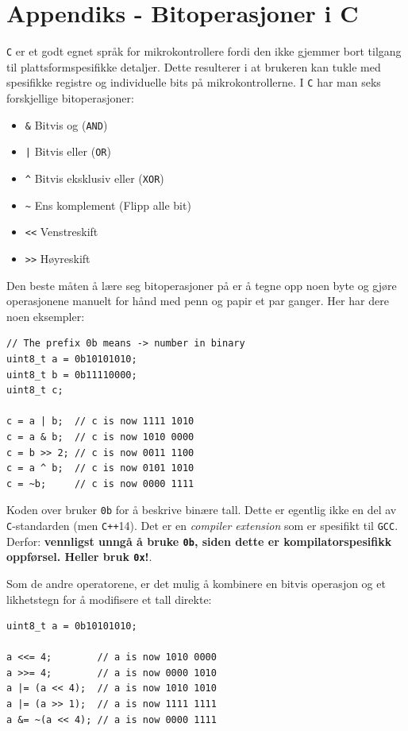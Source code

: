 \section{Appendiks - Bitoperasjoner i C}\label{app:bit}


\verb|C| er et godt egnet språk for mikrokontrollere fordi den ikke gjemmer bort tilgang til plattsformspesifikke detaljer. Dette resulterer i at brukeren kan tukle med spesifikke registre og individuelle bits på mikrokontrollerne. I \verb|C| har man seks forskjellige bitoperasjoner: 

\begin{itemize}
    \item \verb|&| Bitvis og (\verb|AND|)
    \item \texttt{|} Bitvis eller (\verb|OR|)
    \item \verb|^| Bitvis eksklusiv eller (\verb|XOR|)
    \item \verb|~| Ens komplement (Flipp alle bit)
    \item \verb|<<| Venstreskift
    \item \verb|>>| Høyreskift
\end{itemize}


Den beste måten å lære seg bitoperasjoner på er å tegne opp noen byte og gjøre operasjonene manuelt for hånd med penn og papir et par ganger. Her har dere noen eksempler:


\begin{lstlisting}
// The prefix 0b means -> number in binary
uint8_t a = 0b10101010;
uint8_t b = 0b11110000;
uint8_t c;

c = a | b;  // c is now 1111 1010
c = a & b;  // c is now 1010 0000
c = b >> 2; // c is now 0011 1100
c = a ^ b;  // c is now 0101 1010
c = ~b;     // c is now 0000 1111
\end{lstlisting}
Koden over bruker \verb|0b| for å beskrive binære tall. Dette er egentlig ikke en del av \verb|C|-standarden (men \verb|C++|14). Det er en \textit{compiler extension} som er spesifikt til \verb|GCC|. Derfor: \textcolor{RWTHrot100}{\textbf{vennligst unngå å bruke \texttt{0b}, siden dette er kompilatorspesifikk oppførsel. Heller bruk \texttt{0x}!}.}


Som de andre operatorene, er det mulig å kombinere en bitvis operasjon og
et likhetstegn for å modifisere et tall direkte:
\begin{lstlisting}
uint8_t a = 0b10101010;

a <<= 4;        // a is now 1010 0000
a >>= 4;        // a is now 0000 1010
a |= (a << 4);  // a is now 1010 1010
a |= (a >> 1);  // a is now 1111 1111
a &= ~(a << 4); // a is now 0000 1111
\end{lstlisting}

